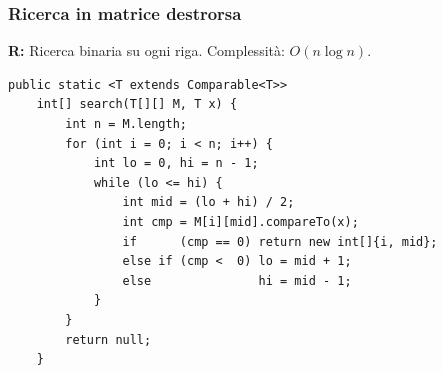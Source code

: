 \subsubsection*{Ricerca in matrice destrorsa}
\textbf{R:} Ricerca binaria su ogni riga. Complessità: $O(n\log n)$.
\begin{lstlisting}[basicstyle=\ttfamily\scriptsize]
	public static <T extends Comparable<T>>
	int[] search(T[][] M, T x) {
		int n = M.length;
		for (int i = 0; i < n; i++) {
			int lo = 0, hi = n - 1;
			while (lo <= hi) {
				int mid = (lo + hi) / 2;
				int cmp = M[i][mid].compareTo(x);
				if      (cmp == 0) return new int[]{i, mid};
				else if (cmp <  0) lo = mid + 1;
				else               hi = mid - 1;
			}
		}
		return null;
	}
\end{lstlisting}

